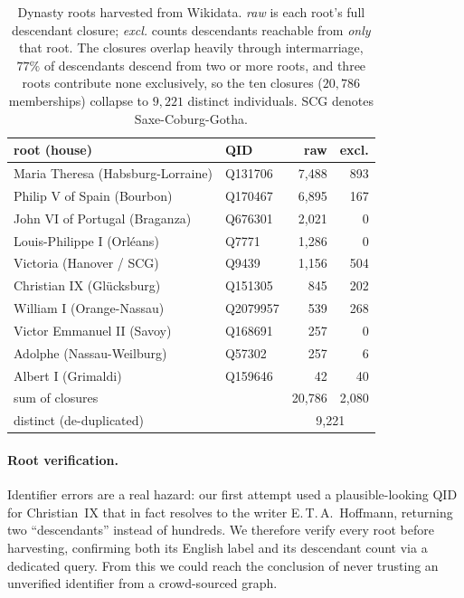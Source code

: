 \begin{table}[H]
\caption{Dynasty roots harvested from Wikidata. \emph{raw} is each root's full
descendant closure; \emph{excl.} counts descendants reachable from \emph{only}
that root. The closures overlap heavily through intermarriage, $77\%$ of
descendants descend from two or more roots, and three roots contribute none
exclusively, so the ten closures ($20{,}786$ memberships) collapse to $9{,}221$
distinct individuals. SCG denotes Saxe-Coburg-Gotha.}
\label{tab:roots}
\centering\small
\begin{tabular}{llrr}
\toprule
root (house) & QID & raw & excl. \\
\midrule
Maria Theresa (Habsburg-Lorraine) & Q131706 & 7{,}488 & 893 \\
Philip V of Spain (Bourbon)       & Q170467 & 6{,}895 & 167 \\
John VI of Portugal (Braganza)    & Q676301 & 2{,}021 & 0   \\
Louis-Philippe I (Orl\'eans)      & Q7771   & 1{,}286 & 0   \\
Victoria (Hanover / SCG)          & Q9439   & 1{,}156 & 504 \\
Christian IX (Gl\"ucksburg)       & Q151305 & 845     & 202 \\
William I (Orange-Nassau)         & Q2079957& 539     & 268 \\
Victor Emmanuel II (Savoy)        & Q168691 & 257     & 0   \\
Adolphe (Nassau-Weilburg)         & Q57302  & 257     & 6   \\
Albert I (Grimaldi)               & Q159646 & 42      & 40  \\
\midrule
sum of closures                   &         & 20{,}786 & 2{,}080 \\
distinct (de-duplicated)          &         & \multicolumn{2}{c}{9{,}221} \\
\bottomrule
\end{tabular}
\end{table}


\paragraph{Root verification.}
Identifier errors are a real hazard: our first attempt used a plausible-looking
QID for Christian~IX that in fact resolves to the writer E.\,T.\,A.\ Hoffmann,
returning two ``descendants'' instead of hundreds. We therefore verify every root
before harvesting, confirming both its English label and its descendant count via
a dedicated query. From this we could reach the conclusion of never trusting an unverified identifier from a crowd-sourced graph.

